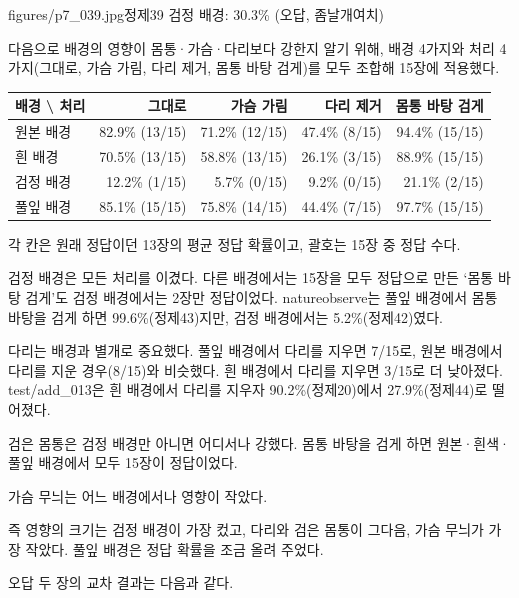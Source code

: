 \documentclass[11pt]{article}
\begin{document}
           {figures/p7_039.jpg}{정제39 검정 배경: 30.3\% (오답, 좀날개여치)}

다음으로 배경의 영향이 몸통·가슴·다리보다 강한지 알기 위해, 배경 4가지와 처리 4가지(그대로, 가슴 가림, 다리 제거, 몸통 바탕 검게)를 모두 조합해 15장에 적용했다.

\begin{center}\footnotesize
\begin{tabular}{lrrrr}
\toprule
배경 \textbackslash{} 처리 & 그대로 & 가슴 가림 & 다리 제거 & 몸통 바탕 검게 \\
\midrule
원본 배경 & 82.9\% (13/15) & 71.2\% (12/15) & 47.4\% (8/15) & 94.4\% (15/15) \\
흰 배경 & 70.5\% (13/15) & 58.8\% (13/15) & 26.1\% (3/15) & 88.9\% (15/15) \\
검정 배경 & 12.2\% (1/15) & 5.7\% (0/15) & 9.2\% (0/15) & 21.1\% (2/15) \\
풀잎 배경 & 85.1\% (15/15) & 75.8\% (14/15) & 44.4\% (7/15) & 97.7\% (15/15) \\
\bottomrule
\end{tabular}
\end{center}
각 칸은 원래 정답이던 13장의 평균 정답 확률이고, 괄호는 15장 중 정답 수다.

검정 배경은 모든 처리를 이겼다. 다른 배경에서는 15장을 모두 정답으로 만든 `몸통 바탕 검게'도 검정 배경에서는 2장만 정답이었다. natureobserve는 풀잎 배경에서 몸통 바탕을 검게 하면 99.6\%(정제43)지만, 검정 배경에서는 5.2\%(정제42)였다.

다리는 배경과 별개로 중요했다. 풀잎 배경에서 다리를 지우면 7/15로, 원본 배경에서 다리를 지운 경우(8/15)와 비슷했다. 흰 배경에서 다리를 지우면 3/15로 더 낮아졌다. test/add\_013은 흰 배경에서 다리를 지우자 90.2\%(정제20)에서 27.9\%(정제44)로 떨어졌다.

검은 몸통은 검정 배경만 아니면 어디서나 강했다. 몸통 바탕을 검게 하면 원본·흰색·풀잎 배경에서 모두 15장이 정답이었다.

가슴 무늬는 어느 배경에서나 영향이 작았다.

즉 영향의 크기는 검정 배경이 가장 컸고, 다리와 검은 몸통이 그다음, 가슴 무늬가 가장 작았다. 풀잎 배경은 정답 확률을 조금 올려 주었다.

오답 두 장의 교차 결과는 다음과 같다.
\end{document}
